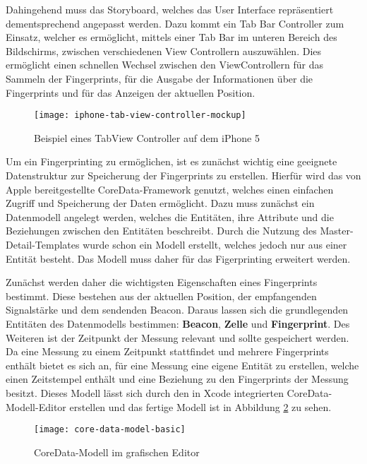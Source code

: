 Dahingehend muss das Storyboard, welches das User Interface repräsentiert dementsprechend angepasst werden.
Dazu kommt ein Tab Bar Controller zum Einsatz, welcher es ermöglicht, mittels einer Tab Bar im unteren Bereich des Bildschirms, zwischen verschiedenen View Controllern auszuwählen. Dies ermöglicht einen schnellen Wechsel zwischen den ViewControllern für das Sammeln der Fingerprints, für die Ausgabe der Informationen über die Fingerprints und für das Anzeigen der aktuellen Position.

\begin{figure}[htb!]
		\centering
	\texttt{[image: iphone-tab-view-controller-mockup]}
	\caption{Beispiel eines TabView Controller auf dem iPhone 5}
	\label{iphone-tab-view-controller}
\end{figure}

Um ein Fingerprinting zu ermöglichen, ist es zunächst wichtig eine geeignete Datenstruktur zur Speicherung der Fingerprints zu erstellen. Hierfür wird das von Apple bereitgestellte CoreData-Framework genutzt, welches einen einfachen Zugriff und Speicherung der Daten ermöglicht. Dazu muss zunächst ein Datenmodell angelegt werden, welches die Entitäten, ihre Attribute und die Beziehungen zwischen den Entitäten beschreibt. Durch die Nutzung des Master-Detail-Templates wurde schon ein Modell erstellt, welches jedoch nur aus einer Entität besteht. Das Modell muss daher für das Figerprinting erweitert werden.

Zunächst werden daher die wichtigsten Eigenschaften eines Fingerprints bestimmt. Diese bestehen aus der aktuellen Position, der empfangenden Signalstärke und dem sendenden Beacon. Daraus lassen sich die grundlegenden Entitäten des Datenmodells bestimmen: \textbf{Beacon}, \textbf{Zelle} und \textbf{Fingerprint}. Des Weiteren ist der Zeitpunkt der Messung relevant und sollte gespeichert werden. Da eine Messung zu einem Zeitpunkt stattfindet und mehrere Fingerprints enthält bietet es sich an, für eine Messung eine eigene Entität zu erstellen, welche einen Zeitstempel enthält und eine Beziehung zu den Fingerprints der Messung besitzt. 
Dieses Modell lässt sich durch den in Xcode integrierten CoreData-Modell-Editor erstellen und das fertige Modell ist in Abbildung \ref{core-data-model-basic} zu sehen.

\begin{figure}[htb!]
		\centering
	\texttt{[image: core-data-model-basic]}
	\caption{CoreData-Modell im grafischen Editor}
	\label{core-data-model-basic}
\end{figure}


